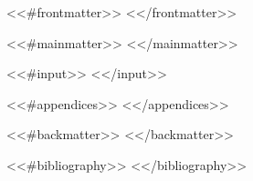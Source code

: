 \documentclass[11pt,a4paper,twoside,openright,<<lang>>]{book}
\begin{document}
<<#frontmatter>>
<</frontmatter>>
\frontmatter




<<#mainmatter>>
<</mainmatter>>
\mainmatter

<<#input>>
<</input>>

% 
% 

<<#appendices>>
<</appendices>>
\begin{appendices}
\end{appendices}

<<#backmatter>>
<</backmatter>>
\backmatter

<<#bibliography>>
<</bibliography>>


\end{document}
